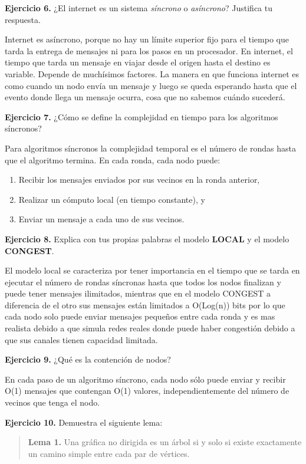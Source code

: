 \documentclass[12pt]{article}
\begin{document}
\begin{ejercicio}
\textbf{Ejercicio 6.} ¿El internet es un sistema \textit{síncrono} o \textit{asíncrono}? Justifica tu respuesta.
\end{ejercicio}
Internet es asíncrono, porque no hay un límite superior fijo para el tiempo que tarda la entrega de mensajes ni para los pasos en un procesador.
En internet, el tiempo que tarda un mensaje en viajar desde el origen hasta el destino es variable. Depende de muchísimos factores.
La manera en que funciona internet es como cuando un nodo envía un mensaje y luego se queda esperando hasta que el evento donde llega un mensaje ocurra, cosa que no sabemos cuándo sucederá.
\vspace{0.5cm}
\begin{ejercicio}
\textbf{Ejercicio 7.} ¿Cómo se define la complejidad en tiempo para los algoritmos síncronos?
\end{ejercicio}
Para algoritmos síncronos la complejidad temporal es el número de rondas hasta que el algoritmo termina.  
En cada ronda, cada nodo puede:
\begin{enumerate}
    \item Recibir los mensajes enviados por sus vecinos en la ronda anterior,
    \item Realizar un cómputo local (en tiempo constante), y
    \item Enviar un mensaje a cada uno de sus vecinos.
\end{enumerate}
\begin{ejercicio}
\textbf{Ejercicio 8.} Explica con tus propias palabras el modelo \textbf{LOCAL} y el modelo \textbf{CONGEST}.
\end{ejercicio}
El modelo local se caracteriza por tener importancia en el tiempo que se tarda en ejecutar el número de rondas síncronas hasta que todos los nodos finalizan y puede tener mensajes ilimitados, mientras que en el modelo CONGEST a diferencia de el otro sus mensajes están limitados a O(Log(n)) bits por lo que cada nodo solo puede enviar mensajes pequeños entre cada ronda y es mas realista debido a que simula redes reales donde puede haber congestión debido a que sus canales tienen capacidad limitada.
\vspace{0.5cm}
\begin{ejercicio}
\textbf{Ejercicio 9.} ¿Qué es la contención de nodos?
\end{ejercicio}
En cada paso de un algoritmo síncrono, cada nodo sólo puede enviar y recibir O(1) mensajes que contengan O(1) valores, independientemente del número de vecinos que tenga el nodo.
\vspace{0.5cm}
\begin{ejercicio}
\textbf{Ejercicio 10.} Demuestra el siguiente lema:
\begin{quote}
\textbf{Lema 1.} Una gráfica no dirigida es un árbol si y solo si existe exactamente un camino simple entre cada par de vértices.
\end{quote}
\end{ejercicio}
\end{document}
